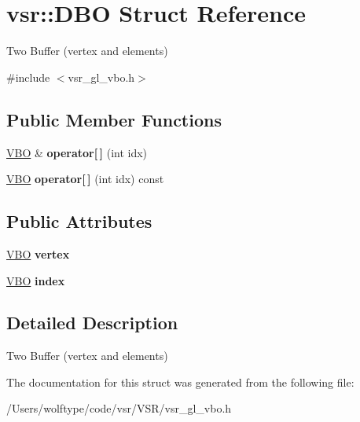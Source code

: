 \hypertarget{structvsr_1_1_d_b_o}{\section{vsr\-:\-:D\-B\-O Struct Reference}
\label{structvsr_1_1_d_b_o}
}


Two Buffer (vertex and elements)  




{\ttfamily \#include $<$vsr\-\_\-gl\-\_\-vbo.\-h$>$}

\subsection*{Public Member Functions}
\begin{DoxyCompactItemize}
\item 
\hypertarget{structvsr_1_1_d_b_o_a6fe12e5057158df48383a450356d1482}{\hyperlink{classvsr_1_1_v_b_o}{V\-B\-O} \& {\bfseries operator\mbox{[}$\,$\mbox{]}} (int idx)}\label{structvsr_1_1_d_b_o_a6fe12e5057158df48383a450356d1482}

\item 
\hypertarget{structvsr_1_1_d_b_o_ad124f25b638ade13bea25e38350c81d8}{\hyperlink{classvsr_1_1_v_b_o}{V\-B\-O} {\bfseries operator\mbox{[}$\,$\mbox{]}} (int idx) const }\label{structvsr_1_1_d_b_o_ad124f25b638ade13bea25e38350c81d8}

\end{DoxyCompactItemize}
\subsection*{Public Attributes}
\begin{DoxyCompactItemize}
\item 
\hypertarget{structvsr_1_1_d_b_o_a2d0a0ec43386a896ba94a7ae0df10384}{\hyperlink{classvsr_1_1_v_b_o}{V\-B\-O} {\bfseries vertex}}\label{structvsr_1_1_d_b_o_a2d0a0ec43386a896ba94a7ae0df10384}

\item 
\hypertarget{structvsr_1_1_d_b_o_a8d5abf1cc4afd500c60523c7964d8c11}{\hyperlink{classvsr_1_1_v_b_o}{V\-B\-O} {\bfseries index}}\label{structvsr_1_1_d_b_o_a8d5abf1cc4afd500c60523c7964d8c11}

\end{DoxyCompactItemize}


\subsection{Detailed Description}
Two Buffer (vertex and elements) 

The documentation for this struct was generated from the following file\-:\begin{DoxyCompactItemize}
\item 
/\-Users/wolftype/code/vsr/\-V\-S\-R/vsr\-\_\-gl\-\_\-vbo.\-h\end{DoxyCompactItemize}
